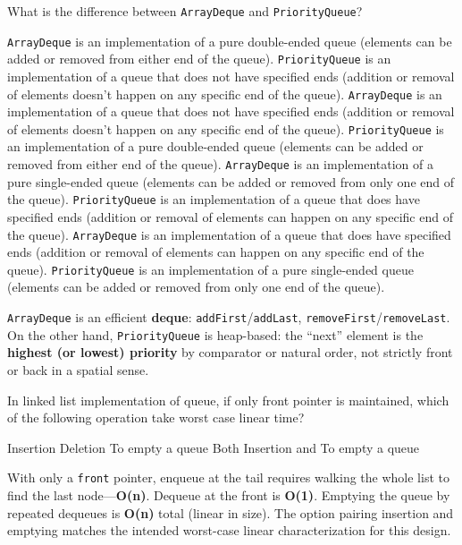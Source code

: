 \question[4]
What is the difference between \texttt{ArrayDeque} and \texttt{PriorityQueue}?
\begin{choices}
  \CorrectChoice \texttt{ArrayDeque} is an implementation of a pure double-ended queue (elements can be added or removed from either end of the queue). \texttt{PriorityQueue} is an implementation of a queue that does not have specified ends (addition or removal of elements doesn't happen on any specific end of the queue).
  \choice \texttt{ArrayDeque} is an implementation of a queue that does not have specified ends (addition or removal of elements doesn't happen on any specific end of the queue). \texttt{PriorityQueue} is an implementation of a pure double-ended queue (elements can be added or removed from either end of the queue).
  \choice \texttt{ArrayDeque} is an implementation of a pure single-ended queue (elements can be added or removed from only one end of the queue). \texttt{PriorityQueue} is an implementation of a queue that does have specified ends (addition or removal of elements can happen on any specific end of the queue).
  \choice \texttt{ArrayDeque} is an implementation of a queue that does have specified ends (addition or removal of elements can happen on any specific end of the queue). \texttt{PriorityQueue} is an implementation of a pure single-ended queue (elements can be added or removed from only one end of the queue).
\end{choices}
\begin{solution}
  \texttt{ArrayDeque} is an efficient \textbf{deque}: \texttt{addFirst}/\texttt{addLast}, 
  \texttt{removeFirst}/\texttt{removeLast}. On the other hand, 
  \texttt{PriorityQueue} is heap-based: the ``next'' element is the 
  \textbf{highest (or lowest) priority} by comparator or natural order, 
  not strictly front or back in a spatial sense.
\end{solution}

\newpage

\question[4]
In linked list implementation of queue, if only front pointer is maintained, which of the following operation take worst case linear time?
\begin{choices}
  \choice Insertion
  \choice Deletion
  \choice To empty a queue
  \CorrectChoice Both Insertion and To empty a queue
\end{choices}
\begin{solution}
  With only a \texttt{front} pointer, enqueue at the tail requires walking the whole list to find the last node---\textbf{O(n)}. Dequeue at the front is \textbf{O(1)}. Emptying the queue by repeated dequeues is \textbf{O(n)} total (linear in size). The option pairing insertion and emptying matches the intended worst-case linear characterization for this design.
\end{solution}

